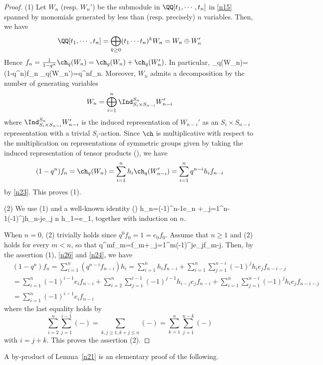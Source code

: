 \begin{proof}
	(1) Let $W_n$ (resp. $W_n'$) be the submodule in $\QQ[t_1,\cdots,t_n]$ in \eqref{n15} spanned by monomials generated by less than (resp. precisely) $n$ variables. Then, we have
	\[\QQ[t_1,\cdots,t_n]=\bigoplus_{k\geq0}(t_1\cdots t_n)^kW_n=W_n\oplus W_n'\] 
	Hence $f_n=\frac{1}{1-q^n}\ch_q (W_n)=\ch_q(W_n)+\ch_q(W_n')$. In particular,
	\beq \label{n23} \ch_q(W_n)=(1-q^n)f_n \aand \ch_q(W_n')=q^nf_n.\eeq
	Moreover, $W_n$ admits a decomposition by the number of generating variables
	\[W_n=\bigoplus_{i=1}^n\Ind^{S_n}_{S_i\times S_{n-i}}W_{n-i}'\]
	where $\Ind^{S_n}_{S_i\times S_{n-i}}W'_{n-i}$ is the induced representation of $W_{n-i}'$ as an $S_i\times S_{n-i}$ representation with a trivial $S_i$-action. Since $\ch$ is multiplicative with respect to the multiplication on representations of symmetric groups given by taking the induced representation of tensor products (\cite[I,~(7.3)]{Mac}), we have
	\[(1-q^n)f_n=\ch_q(W_n)=\sum_{i=1}^nh_i\ch_q(W_{n-i}')=\sum_{i=1}^n q^{n-i}h_if_{n-i}\]
	by \eqref{n23}. This proves (1).
	
	(2) We use (1) and a well-known identity (\cite[I,~(2.6)]{Mac})
	\beq\label{n24} h_n=(-1)^{n-1}e_n +\sum_{j=1}^{n-1}(-1)^jh_{n-j}e_j \quad {}n \aand h_1=e_1,
	\eeq
	together with induction on $n$. 
	
	When $n=0$, (2) trivially holds since $q^0f_0=1=e_0f_0$. Assume that $n\geq 1$ and (2) holds for every $m<n$, so that
	\beq \label{n26} q^mf_m=f_m+\sum_{j=1}^m(-1)^je_jf_{m-j}.\eeq
	Then, by the assertion (1), \eqref{n26} and \eqref{n24}, we have
	\[\begin{split}
		&(1-q^n)f_n=\sum_{i=1}^n(q^{n-i}f_{n-i})h_i=\sum_{i=1}^nh_if_{n-i}+\sum_{i=1}^n\sum_{j=1}^{n-i}(-1)^jh_ie_jf_{n-i-j}\\
		&=\sum_{i=1}^n(-1)^{i-1}e_if_{n-i} +\sum_{i=2}^n\sum_{j=1}^{i-1}(-1)^{j-1}h_{i-j}e_jf_{n-i}+\sum_{i=1}^n\sum_{j=1}^{n-i}(-1)^jh_ie_jf_{n-i-j}\\
		&=\sum_{i=1}^n(-1)^{i-1}e_if_{n-i}
	\end{split}\]
	where the last equality holds by 
	\[\sum_{i=2}^n\sum_{j=1}^{i-1}(-)=\sum_{k,j\geq 1, k+j\leq n}(-)=\sum_{k=1}^n\sum_{j=1}^{n-k}(-)\]
	with $i=j+k$. This proves the assertion (2).
\end{proof}

A by-product of Lemma~\ref{n21} is an elementary proof of the following. 

